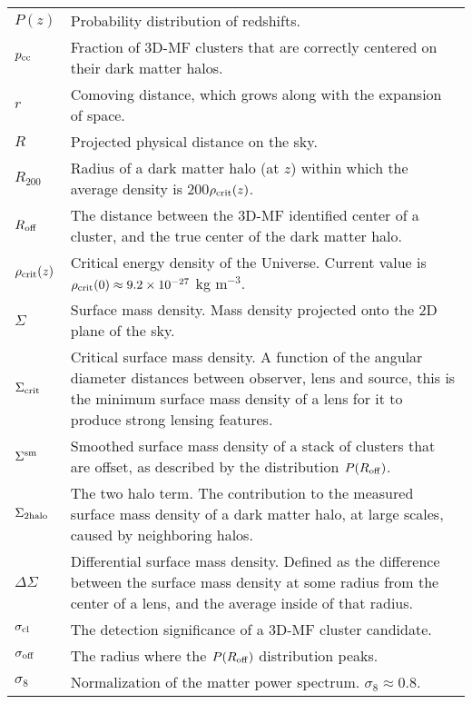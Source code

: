 \section*{\underline{}}
\vspace{-0.5cm}
\begin{tabular}{p{0.6in}p{5.8in}}

$P(z)$ & Probability distribution of redshifts. \\
$p_{\rm cc}$ & Fraction of \acs{3D-MF} clusters that are correctly centered on their dark matter halos. \\
$r$ & Comoving distance, which grows along with the expansion of space. \\
$R$ & Projected physical distance on the sky. \\
$R_{200}$ & Radius of a dark matter halo (at $z$) within which the average density is 200$\rho_{\rm crit}(z)$. \\
$R_{\rm off}$ & The distance between the \acs{3D-MF} identified center of a cluster, and the true center of the dark matter halo. \\
$\rho_{\rm crit}(z)$ & Critical energy density of the Universe. Current value is $\rho_{\rm crit}(0) \approx 9.2 \times 10^{-27}$ kg m$^{-3}$. \\
$\Sigma$ & Surface mass density. Mass density projected onto the 2D plane of the sky. \\
$\Sigma_{\rm crit}$ & Critical surface mass density. A function of the angular diameter distances between observer, lens and source, this is the minimum surface mass density of a lens for it to produce strong lensing features. \\
$\Sigma^{\rm sm}$ & Smoothed surface mass density of a stack of clusters that are offset, as described by the distribution $P(R_{\rm off})$. \\
$\Sigma_{\rm 2halo}$ & The two halo term. The contribution to the measured surface mass density of a dark matter halo, at large scales, caused by neighboring halos. \\
$\Delta\Sigma$ & Differential surface mass density. Defined as the difference between the surface mass density at some radius from the center of a lens, and the average inside of that radius. \\
$\sigma_{\rm cl}$ & The detection significance of a \acs{3D-MF} cluster candidate. \\
$\sigma_{\rm off}$ & The radius where the $P(R_{\rm off})$ distribution peaks. \\
$\sigma_8$ & Normalization of the matter power spectrum.  $\sigma_8 \approx 0.8$. \\

\end{tabular}
